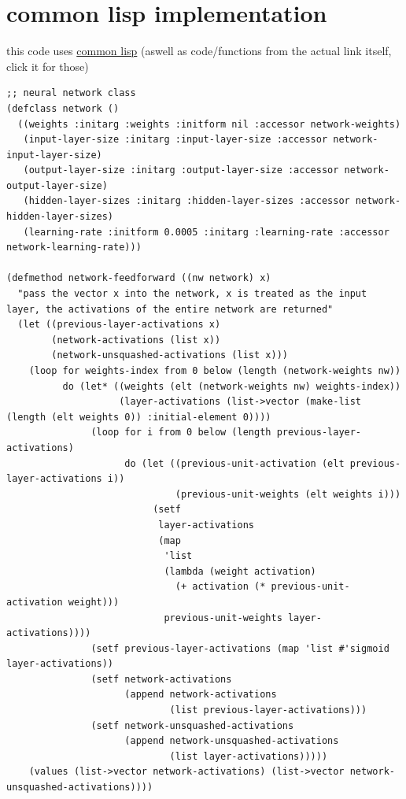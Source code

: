 \documentclass[a4paper,12pt]{article}
\begin{document}
\section{common lisp implementation}
\label{sec:org40ea95e}
this code uses \href{20230224163920-common_lisp.org}{common lisp} (aswell as code/functions from the actual link itself, click it for those)\\
\lstset{language=Lisp,label= ,caption= ,captionpos=b,numbers=none}
\begin{lstlisting}
;; neural network class
(defclass network ()
  ((weights :initarg :weights :initform nil :accessor network-weights)
   (input-layer-size :initarg :input-layer-size :accessor network-input-layer-size)
   (output-layer-size :initarg :output-layer-size :accessor network-output-layer-size)
   (hidden-layer-sizes :initarg :hidden-layer-sizes :accessor network-hidden-layer-sizes)
   (learning-rate :initform 0.0005 :initarg :learning-rate :accessor network-learning-rate)))

(defmethod network-feedforward ((nw network) x)
  "pass the vector x into the network, x is treated as the input layer, the activations of the entire network are returned"
  (let ((previous-layer-activations x)
        (network-activations (list x))
        (network-unsquashed-activations (list x)))
    (loop for weights-index from 0 below (length (network-weights nw))
          do (let* ((weights (elt (network-weights nw) weights-index))
                    (layer-activations (list->vector (make-list (length (elt weights 0)) :initial-element 0))))
               (loop for i from 0 below (length previous-layer-activations)
                     do (let ((previous-unit-activation (elt previous-layer-activations i))
                              (previous-unit-weights (elt weights i)))
                          (setf
                           layer-activations
                           (map
                            'list
                            (lambda (weight activation)
                              (+ activation (* previous-unit-activation weight)))
                            previous-unit-weights layer-activations))))
               (setf previous-layer-activations (map 'list #'sigmoid layer-activations))
               (setf network-activations
                     (append network-activations
                             (list previous-layer-activations)))
               (setf network-unsquashed-activations
                     (append network-unsquashed-activations
                             (list layer-activations)))))
    (values (list->vector network-activations) (list->vector network-unsquashed-activations))))


\end{lstlisting}
\end{document}
